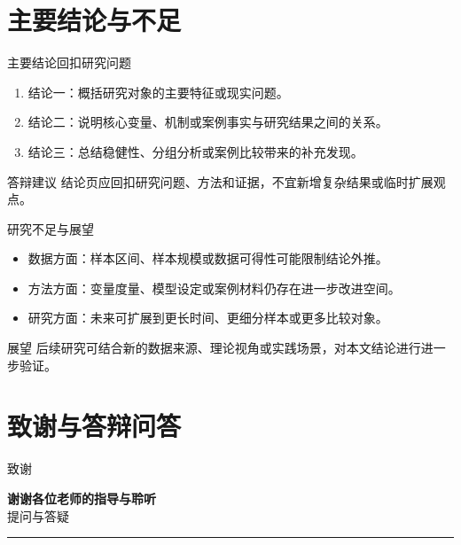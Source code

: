 \documentclass[aspectratio=169,11pt]{beamer}
\begin{document}
\section{主要结论与不足}

\begin{frame}{主要结论}{回扣研究问题}
  \begin{enumerate}
    \item 结论一：概括研究对象的主要特征或现实问题。
    \item 结论二：说明核心变量、机制或案例事实与研究结果之间的关系。
    \item 结论三：总结稳健性、分组分析或案例比较带来的补充发现。
  \end{enumerate}
  \begin{block}{答辩建议}
    结论页应回扣研究问题、方法和证据，不宜新增复杂结果或临时扩展观点。
  \end{block}
\end{frame}

\begin{frame}{研究不足与展望}
  \begin{itemize}
    \item 数据方面：样本区间、样本规模或数据可得性可能限制结论外推。
    \item 方法方面：变量度量、模型设定或案例材料仍存在进一步改进空间。
    \item 研究方面：未来可扩展到更长时间、更细分样本或更多比较对象。
  \end{itemize}
  \begin{alertblock}{展望}
    后续研究可结合新的数据来源、理论视角或实践场景，对本文结论进行进一步验证。
  \end{alertblock}
\end{frame}

\section{致谢与答辩问答}

\begin{frame}{致谢}
  \begin{center}
    \vspace{0.7cm}
    {\LARGE\bfseries\color{swufeBlue}谢谢各位老师的指导与聆听}\\[0.8cm]
    {\Large\color{swufeGold}提问与答疑}\\[0.5cm]
    \rule{0.55\linewidth}{0.6pt}\\[0.5cm]
    \swufeUniversityCN
  \end{center}
\end{frame}
\end{document}
